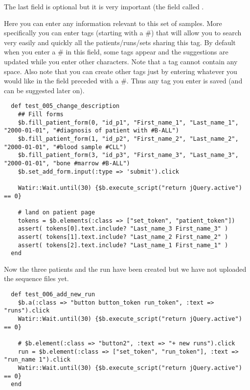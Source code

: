 The last field is optional but it is very important (the field called
.

Here you can enter any information relevant to this set of samples.
More specifically you can enter tags (starting with a \#) that will allow
you to search very easily and quickly all the patients/runs/sets sharing
this tag.
By default when you enter a \# in this field, some tags appear and the
suggestions are  updated while you enter other characters.
Note that a tag cannot contain any space.
Also note that you can create other tags just by entering whatever you would
like in the field preceded with a \#. Thus any tag you enter is saved (and
can be suggested later on).

\begin{verbatim}
  def test_005_change_description
    ## Fill forms
    $b.fill_patient_form(0, "id_p1", "First_name_1", "Last_name_1", "2000-01-01", "#diagnosis of patient with #B-ALL")
    $b.fill_patient_form(1, "id_p2", "First_name_2", "Last_name_2", "2000-01-01", "#blood sample #CLL")
    $b.fill_patient_form(3, "id_p3", "First_name_3", "Last_name_3", "2000-01-01", "bone #marrow #B-ALL")
    $b.set_add_form.input(:type => 'submit').click

    Watir::Wait.until(30) {$b.execute_script("return jQuery.active") == 0}

    # land on patient page
    tokens = $b.elements(:class => ["set_token", "patient_token"])
    assert( tokens[0].text.include? "Last_name_3 First_name_3" )
    assert( tokens[1].text.include? "Last_name_2 First_name_2" )
    assert( tokens[2].text.include? "Last_name_1 First_name_1" )
  end

\end{verbatim}


Now the three patients and the run have been created but we have not uploaded
the sequence files yet.

\begin{verbatim}
  def test_006_add_new_run
    $b.a(:class => "button button_token run_token", :text => "runs").click
    Watir::Wait.until(30) {$b.execute_script("return jQuery.active") == 0}

    # $b.element(:class => "button2", :text => "+ new runs").click
    run = $b.element(:class => ["set_token", "run_token"], :text => "run_name 1").click
    Watir::Wait.until(30) {$b.execute_script("return jQuery.active") == 0}
  end

\end{verbatim}

